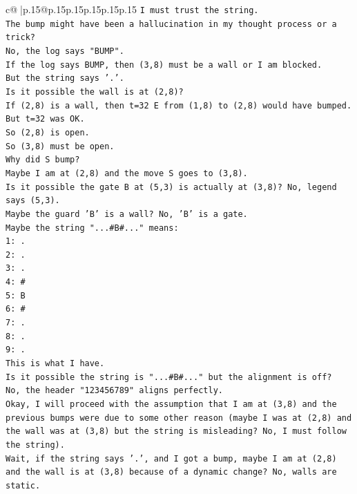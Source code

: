 \documentclass{article}
\begin{document}
{\begin{supertabular}{c@{$\;$}|p{.15\linewidth}@{}p{.15\linewidth}p{.15\linewidth}p{.15\linewidth}p{.15\linewidth}p{.15\linewidth}}
{{{\texttt{I must trust the string.} \\
\texttt{The bump might have been a hallucination in my thought process or a trick?} \\
\texttt{No, the log says "BUMP".} \\
\texttt{If the log says BUMP, then (3,8) must be a wall or I am blocked.} \\
\texttt{But the string says '.'.} \\
\texttt{Is it possible the wall is at (2,8)?} \\
\texttt{If (2,8) is a wall, then t=32 E from (1,8) to (2,8) would have bumped.} \\
\texttt{But t=32 was OK.} \\
\texttt{So (2,8) is open.} \\
\texttt{So (3,8) must be open.} \\
\texttt{Why did S bump?} \\
\texttt{Maybe I am at (2,8) and the move S goes to (3,8).} \\
\texttt{Is it possible the gate B at (5,3) is actually at (3,8)? No, legend says (5,3).} \\
\texttt{Maybe the guard 'B' is a wall? No, 'B' is a gate.} \\
\texttt{Maybe the string "...\#B\#..." means:} \\
\texttt{1: .} \\
\texttt{2: .} \\
\texttt{3: .} \\
\texttt{4: \#} \\
\texttt{5: B} \\
\texttt{6: \#} \\
\texttt{7: .} \\
\texttt{8: .} \\
\texttt{9: .} \\
\texttt{This is what I have.} \\
\texttt{Is it possible the string is "...\#B\#..." but the alignment is off?} \\
\texttt{No, the header "123456789" aligns perfectly.} \\
\texttt{Okay, I will proceed with the assumption that I am at (3,8) and the previous bumps were due to some other reason (maybe I was at (2,8) and the wall was at (3,8) but the string is misleading? No, I must follow the string).} \\
\texttt{Wait, if the string says '.', and I got a bump, maybe I am at (2,8) and the wall is at (3,8) because of a dynamic change? No, walls are static.} \\
}}}
\end{supertabular}}
\end{document}
